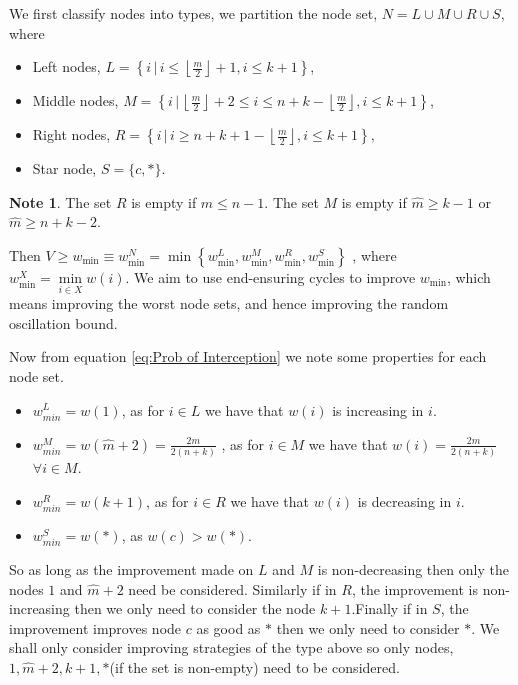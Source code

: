 \documentclass[a4paper,10pt]{article}
\newcommand{\floor}[1]{\left \lfloor #1 \right \rfloor}
\theoremstyle{definition}
\theoremstyle{definition}
\theoremstyle{remark}
\theoremstyle{definition}
\newtheorem*{note}{Note}
\begin{document}
We first classify nodes into types, we partition the node set, $N=L \cup M \cup R \cup S$, where
\begin{itemize}
\item Left nodes, $L=\left\{ i \, | \, i \leq \floor{\frac{m}{2}}+1 , i \leq k+1 \right\}$, 
\item Middle nodes, $M=\left\{ i \, | \, \floor{\frac{m}{2}}+2 \leq i \leq n+k-\floor{\frac{m}{2}} , i \leq k+1 \right\}$,
\item Right nodes, $R=\left\{ i \, | \, i \geq n+k+1-\floor{\frac{m}{2}} , i \leq k+1 \right\}$,
\item Star node, $S=\{ c,* \}$.
\end{itemize}

\begin{note}
The set $R$ is empty if $\hat{m} \leq n-1$. The set $M$ is empty if $\hat{m} \geq k-1$ or $\hat{m} \geq n+k-2$.
\end{note}

Then $ V \geq w_{\min} \equiv w_{\min}^{N}=\min \left\{ w_{\min}^{L},w_{\min}^{M},w_{\min}^{R},w_{\min}^{S} \right\}$ , where $w_{\min}^{X}=\min\limits_{i \in X} w(i)$. We aim to use end-ensuring cycles to improve $w_{\min}$, which means improving the worst node sets, and hence improving the random oscillation bound.


Now from equation \ref{eq:Prob of Interception} we note some properties for each node set.
\begin{itemize}
\item $w_{min}^{L}=w(1)$, as for $i \in L$ we have that $w(i)$ is increasing in $i$.
\item $w_{min}^{M}=w(\hat{m}+2)=\frac{2m}{2(n+k)}$ , as for $i \in M $ we have that $w(i)=\frac{2m}{2(n+k)}$ $\forall i \in M$.
\item $w_{min}^{R}=w(k+1)$, as for $i \in R$ we have that $w(i)$ is decreasing in $i$.
\item $w_{min}^{S}=w(*)$, as $w(c) > w(*)$.
\end{itemize}

So as long as the improvement made on $L$ and $M$ is non-decreasing then only the nodes $1$ and $\hat{m}+2$ need be considered. Similarly if in $R$, the improvement is non-increasing then we only need to consider the node $k+1$.Finally if in $S$, the improvement improves node $c$ as good as $*$ then we only need to consider $*$. We shall only consider improving strategies of the type above so only nodes, $1,\hat{m}+2,k+1,*$(if the set is non-empty) need to be considered.
\end{document}
